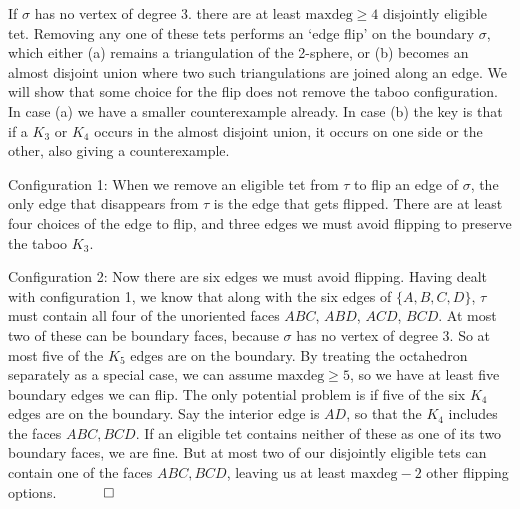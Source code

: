 \documentclass[12pt]{article}
\newcommand{\proofend}{$\quad \qed$}
\newcommand{\kw}{\mathrm}
\newcommand{\maxdeg}{\kw{maxdeg}}
\begin{document}
If $\sigma$ has no vertex of degree 3.
there are at least $\maxdeg \geq 4$ disjointly eligible tet.
Removing any one of these tets performs an `edge flip' on the boundary
$\sigma$,
which either (a) remains a triangulation of the 2-sphere,
or (b) becomes an almost disjoint union where
two such triangulations are joined along an edge.
We will show that some choice for the flip does not remove the taboo
configuration.
In case (a) we have a smaller counterexample already.
In case (b) the key is that if a $K_3$ or $K_4$ occurs
in the almost disjoint union, it occurs on one side or the other,
also giving a counterexample.

Configuration 1:
When we remove an eligible tet from $\tau$ to flip an edge of $\sigma$,
the only edge that disappears from $\tau$ is the edge that gets flipped.
There are at least four choices of the edge to flip, and three edges we must
avoid flipping to preserve the taboo $K_3$.

Configuration 2:
Now there are six edges we must avoid flipping.
Having dealt with configuration 1,
we know that along with the six edges of $\{A,B,C,D\}$,
$\tau$ must contain all four of the unoriented faces
$ABC$, $ABD$, $ACD$, $BCD$.
At most two of these can be boundary faces, because
$\sigma$ has no vertex of degree 3.
So at most five of the $K_5$ edges are on the boundary.
By treating the octahedron separately as a special case,
we can assume $\maxdeg \geq 5$,
so we have at least five boundary edges we can flip.
The only potential problem is if five of the six $K_4$ edges are
on the boundary.
Say the interior edge is $AD$,
so that the $K_4$ includes the faces $ABC,BCD$.
If an eligible tet contains neither of these as one of its two boundary faces,
we are fine.
But at most two of our disjointly eligible tets
can contain one of the faces $ABC,BCD$,
leaving us at least $\maxdeg-2$ other flipping options.
\proofend



\end{document}
